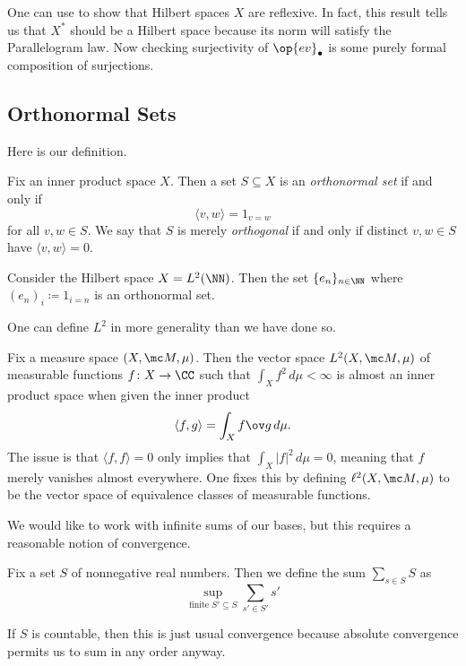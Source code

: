 \documentclass[../notes.tex]{subfiles}
\begin{document}
\begin{remark}
	One can use  to show that Hilbert spaces $X$ are reflexive. In fact, this result tells us that $X^*$ should be a Hilbert space because its norm will satisfy the Parallelogram law. Now checking surjectivity of $\op{ev}_\bullet$ is some purely formal composition of surjections.
\end{remark}

\subsection{Orthonormal Sets}
Here is our definition.
\begin{definition}[orthonormal]
	Fix an inner product space $X$. Then a set $S\subseteq X$ is an \textit{orthonormal set} if and only if
	\[\langle v,w\rangle=1_{v=w}\]
	for all $v,w\in S$. We say that $S$ is merely \textit{orthogonal} if and only if distinct $v,w\in S$ have $\langle v,w\rangle=0$.
\end{definition}
\begin{example}
	Consider the Hilbert space $X=L^2(\NN)$. Then the set $\{e_n\}_{n\in\NN}$ where $(e_n)_i\coloneqq1_{i=n}$ is an orthonormal set.
\end{example}
One can define $L^2$ in more generality than we have done so.
\begin{example}
	Fix a measure space $(X,\mc M,\mu)$. Then the vector space $L^2(X,\mc M,\mu)$ of measurable functions $f\colon X\to\CC$ such that $\int_Xf^2\,d\mu<\infty$ is almost an inner product space when given the inner product
	\[\langle f,g\rangle=\int_Xf\ov g\,d\mu.\]
	The issue is that $\langle f,f\rangle=0$ only implies that $\int_X\left|f\right|^2\,d\mu=0$, meaning that $f$ merely vanishes almost everywhere. One fixes this by defining $\ell^2(X,\mc M,\mu)$ to be the vector space of equivalence classes of measurable functions.
\end{example}
We would like to work with infinite sums of our bases, but this requires a reasonable notion of convergence.
\begin{definition}
	Fix a set $S$ of nonnegative real numbers. Then we define the sum $\sum_{s\in S}S$ as
	\[\sup_{\text{finite }S'\subseteq S}\sum_{s'\in S'}s'\]
\end{definition}
\begin{remark}
	If $S$ is countable, then this is just usual convergence because absolute convergence permits us to sum in any order anyway.
\end{remark}
\end{document}
